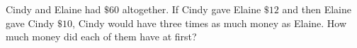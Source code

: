 Cindy and Elaine had $\$60$ altogether. If Cindy gave Elaine $\$12$ and then Elaine gave Cindy $\$10$, Cindy would have three times as much money as Elaine. How much money did each of them have at first?
